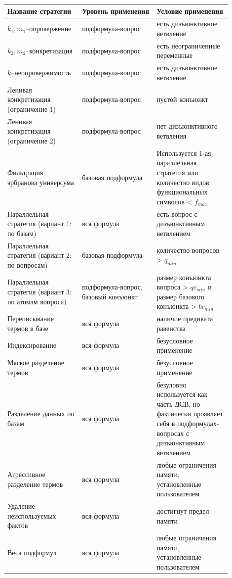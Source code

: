 \begin{longtable}[H]{|p{0.3\linewidth}|p{0.3\linewidth}|p{0.3\linewidth}|}
\hline
\textbf{Название стратегии} & \textbf{Уровень применения} & \textbf{Условие применения}\\
\hline
$k_1,m_1$--опровержение & подформула-вопрос & есть дизъюнктивное ветвление \\
\hline
$k_2,m_2$--конкретизация & подформула-вопрос & есть неограниченные переменные \\
\hline
$k$--неопровержимость & подформула-вопрос & есть дизъюнктивное ветвление \\ 
\hline
Ленивая конкретизация (ограничение 1) & подформула-вопрос & пустой конъюнкт \\
\hline
Ленивая конкретизация (ограничение 2) & подформула-вопрос & нет дизъюнктивного ветвления \\
\hline
Фильтрация эрбранова универсума & базовая подформула & Используется 1-ая параллельная стратегия или количество видов функциональных символов < $f_{max}$ \\
\hline
Параллельная стратегия (вариант 1: по базам) & вся формула & есть вопрос с дизъюнктивным ветвлением \\
\hline
Параллельная стратегия (вариант 2: по вопросам) & базовая подформула & количество вопросов > $q_{min}$ \\
\hline
Параллельная стратегия (вариант 3: по атомам вопроса) & подформула-вопрос, базовый конъюнкт & размер конъюнкта вопроса > $qc_{min}$ и размер базового конъюнкта > $bc_{min}$  \\
\hline
Переписывание термов в базе & вся формула & наличие предиката равенства \\
\hline
Индексирование & вся формула & безусловное применение \\
\hline
Мягкое разделение термов & вся формула & безусловное применение \\
\hline
Разделение данных по базам & вся формула & безуловно используется как часть ДСВ, но фактически проявляет себя в подформулах-вопросах с дизъюнктивным ветвлением \\
\hline
Агрессивное разделение термов & вся формула & любые ограничения памяти, установленные пользователем \\
\hline
Удаление неиспользуемых фактов & вся формула & достигнут предел памяти \\
\hline
Веса подформул & вся формула & любые ограничения памяти, установленные пользователем \\
\hline
\end{longtable}

